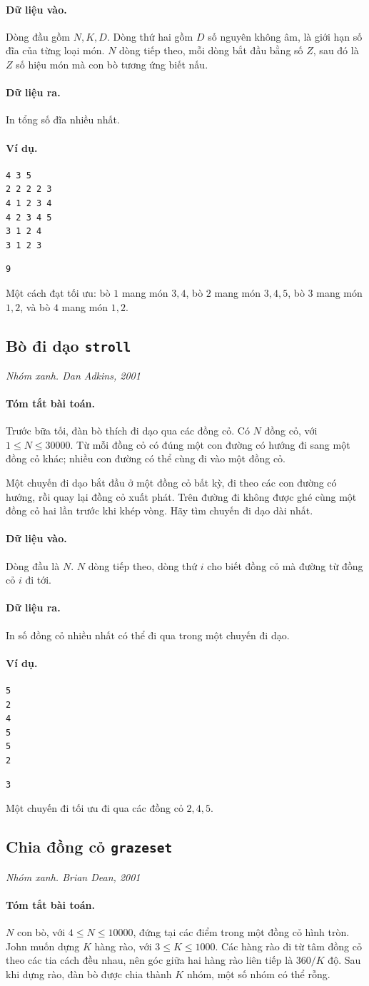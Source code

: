 \documentclass[11pt]{article}
\newcommand{\problem}[4]{%
  \subsection[#1 (#2)]{#1 \hfill {\normalsize\texttt{#2}}}%
  \noindent\textit{#3. #4}\par\smallskip
}
\newcommand{\iosec}[1]{\paragraph{#1}}
\begin{document}
\iosec{Dữ liệu vào.}
Dòng đầu gồm \(N,K,D\). Dòng thứ hai gồm \(D\) số nguyên không âm, là giới hạn
số đĩa của từng loại món. \(N\) dòng tiếp theo, mỗi dòng bắt đầu bằng số
\(Z\), sau đó là \(Z\) số hiệu món mà con bò tương ứng biết nấu.

\iosec{Dữ liệu ra.}
In tổng số đĩa nhiều nhất.

\iosec{Ví dụ.}
\begin{verbatim}
4 3 5
2 2 2 2 3
4 1 2 3 4
4 2 3 4 5
3 1 2 4
3 1 2 3
\end{verbatim}

\begin{verbatim}
9
\end{verbatim}

Một cách đạt tối ưu: bò \(1\) mang món \(3,4\), bò \(2\) mang món \(3,4,5\),
bò \(3\) mang món \(1,2\), và bò \(4\) mang món \(1,2\).

\problem{Bò đi dạo}{stroll}{Nhóm xanh}{Dan Adkins, 2001}

\iosec{Tóm tắt bài toán.}
Trước bữa tối, đàn bò thích đi dạo qua các đồng cỏ. Có \(N\) đồng cỏ, với
\(1\le N\le 30000\). Từ mỗi đồng cỏ có đúng một con đường có hướng đi sang một
đồng cỏ khác; nhiều con đường có thể cùng đi vào một đồng cỏ.

Một chuyến đi dạo bắt đầu ở một đồng cỏ bất kỳ, đi theo các con đường có
hướng, rồi quay lại đồng cỏ xuất phát. Trên đường đi không được ghé cùng một
đồng cỏ hai lần trước khi khép vòng. Hãy tìm chuyến đi dạo dài nhất.

\iosec{Dữ liệu vào.}
Dòng đầu là \(N\). \(N\) dòng tiếp theo, dòng thứ \(i\) cho biết đồng cỏ mà
đường từ đồng cỏ \(i\) đi tới.

\iosec{Dữ liệu ra.}
In số đồng cỏ nhiều nhất có thể đi qua trong một chuyến đi dạo.

\iosec{Ví dụ.}
\begin{verbatim}
5
2
4
5
5
2
\end{verbatim}

\begin{verbatim}
3
\end{verbatim}

Một chuyến đi tối ưu đi qua các đồng cỏ \(2,4,5\).

\problem{Chia đồng cỏ}{grazeset}{Nhóm xanh}{Brian Dean, 2001}

\iosec{Tóm tắt bài toán.}
\(N\) con bò, với \(4\le N\le 10000\), đứng tại các điểm trong một đồng cỏ
hình tròn. John muốn dựng \(K\) hàng rào, với \(3\le K\le 1000\). Các hàng rào
đi từ tâm đồng cỏ theo các tia cách đều nhau, nên góc giữa hai hàng rào liên
tiếp là \(360/K\) độ. Sau khi dựng rào, đàn bò được chia thành \(K\) nhóm, một
số nhóm có thể rỗng.
\end{document}
